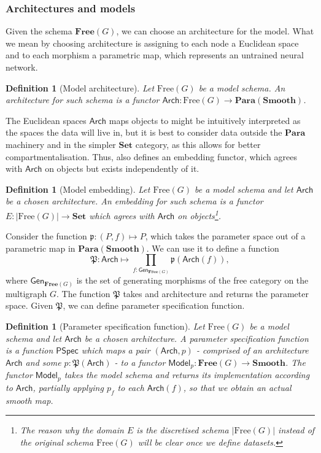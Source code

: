 \documentclass[12pt,a4paper,openright,twoside]{report}
\theoremstyle{plain}
\newtheorem{definition}[proposition]{Definition}
\theoremstyle{definition}
\begin{document}
\subsubsection{Architectures and models}


Given the schema $\mathbf{Free}(G)$, we can choose an architecture for the model. What we mean by choosing architecture is assigning to each node a Euclidean space and to each morphism a parametric map, which represents an untrained neural network.

\begin{definition}[Model architecture]
  Let $\mathrm{Free}(G)$ be a model schema. An architecture for such schema is a functor $\mathsf{Arch}: \mathrm{Free}(G) \to \mathbf{Para}(\mathbf{Smooth})$.
\end{definition}

The Euclidean spaces $\mathsf{Arch}$ maps objects to might be intuitively interpreted as the spaces the data will live in, but it is best to consider data outside the $\mathbf{Para}$ machinery and in the simpler $\mathbf{Set}$ category, as this allows for better compartmentalisation. Thus, \cite{gavranovic2019compositional} also defines an embedding functor, which agrees with $\mathsf{Arch}$ on objects but exists independently of it.


\begin{definition}[Model embedding]
  Let $\mathrm{Free}(G)$ be a model schema and let $\mathsf{Arch}$ be a chosen architecture. An embedding for such schema is a functor $E: |\mathrm{Free}(G)| \to \mathbf{Set}$ which agrees with $\mathsf{Arch}$ on objects\footnote{The reason why the domain $E$ is the discretised schema $|\mathrm{Free}(G)|$ instead of the original schema $\mathrm{Free}(G)$ will be clear once we define datasets.}.
\end{definition}

Consider the function $\mathfrak{p}: (P,f) \mapsto P$, which takes the parameter space out of a parametric map in $\mathbf{Para}(\mathbf{Smooth})$. We can use it to define a function 
\[\mathfrak{P}: \mathsf{Arch} \mapsto \prod_{f : \mathsf{Gen}_{\mathbf{Free}(G)}}\mathfrak{p}(\mathsf{Arch}(f)),\]
where $\mathsf{Gen}_{\mathbf{Free}(G)}$ is the set of generating morphisms of the free category on the multigraph $G$. The function $\mathfrak{P}$ takes and architecture and returns the parameter space. Given $\mathfrak{P}$, we can define parameter specification function.

\begin{definition}[Parameter specification function]
  Let $\mathrm{Free}(G)$ be a model schema and let $\mathsf{Arch}$ be a chosen architecture. A parameter specification function is a function $\mathsf{PSpec}$ which maps a pair $(\mathsf{Arch}, p)$ - comprised of an architecture $\mathsf{Arch}$ and some $p : \mathfrak{P}(\mathsf{Arch})$ - to a functor $\mathsf{Model}_p: \mathbf{Free}(G) \to \mathbf{Smooth}$. The functor $\mathsf{Model}_p$ takes the model schema and returns its implementation according to $\mathsf{Arch}$, partially applying $p_f$ to each $\mathsf{Arch}(f)$, so that we obtain an actual smooth map. 
\end{definition}
\end{document}
